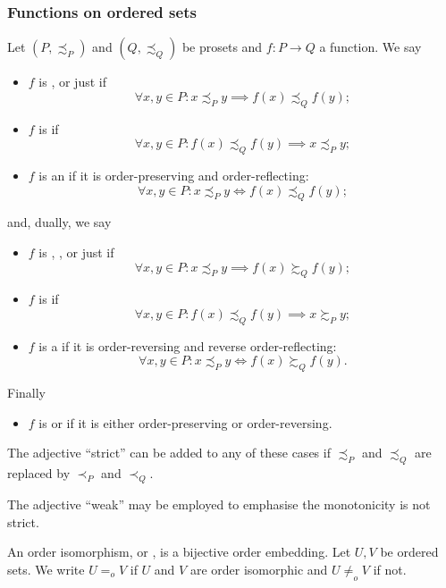 \subsubsection{Functions on ordered sets}
\begin{definition}
Let $(P, \precsim_P)$ and $(Q, \precsim_Q)$ be prosets and $f: P\to Q$ a function. We say
\begin{itemize}
\item $f$ is ,  or just  if
\[ \forall x,y\in P: x\precsim_P y \implies f(x)\precsim_Q f(y); \]
\item $f$ is  if
\[ \forall x,y\in P: f(x)\precsim_Q f(y) \implies x\precsim_P y; \]
\item $f$ is an  if it is order-preserving and order-reflecting:
\[ \forall x,y\in P: x\precsim_P y \iff f(x)\precsim_Q f(y); \]
\end{itemize}
and, dually, we say
\begin{itemize}
\item $f$ is , ,  or just  if
\[ \forall x,y\in P: x\precsim_P y \implies f(x) \succsim_Q f(y); \]
\item $f$ is  if
\[ \forall x,y\in P: f(x)\precsim_Q f(y) \implies x\succsim_P y; \]
\item $f$ is a  if it is order-reversing and reverse order-reflecting:
\[ \forall x,y\in P: x\precsim_P y \iff f(x)\succsim_Q f(y). \]
\end{itemize}
Finally
\begin{itemize}
\item $f$ is  or  if it is either order-preserving or order-reversing.
\end{itemize}

The adjective ``strict'' can be added to any of these cases if $\precsim_P$ and $\precsim_Q$ are replaced by $\prec_P$ and $\prec_Q$.

The adjective ``weak'' may be employed to emphasise the monotonicity is not strict.
\end{definition}
An order isomorphism, or , is a bijective order embedding. Let $U,V$ be ordered sets. We write $U =_o V$ if $U$ and $V$ are order isomorphic and $U \neq_o V$ if not.

